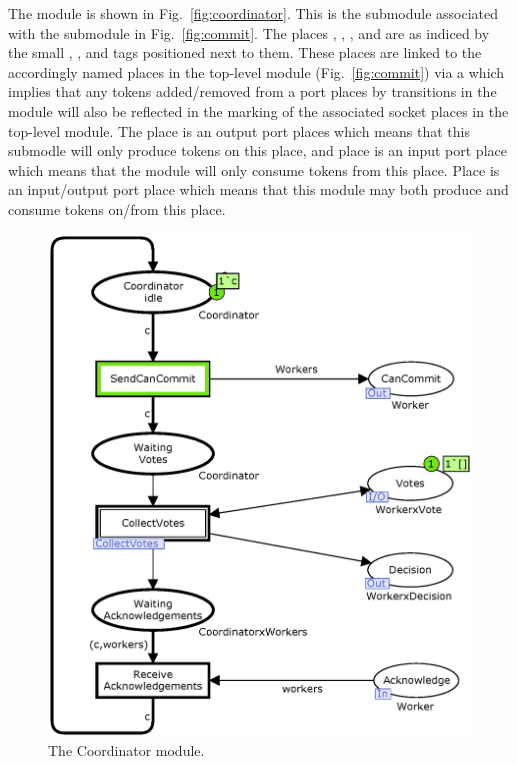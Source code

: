 
The  module is shown in
Fig.~\ref{fig:coordinator}. This is the submodule associated with the
 submodule in Fig.~\ref{fig:commit}. The places
, , , and
 are  as indiced by the
small , , and  tags positioned
next to them. These places are linked to the accordingly named places
in the top-level module (Fig.~\ref{fig:commit}) via a
 which implies that any tokens
added/removed from a port places by transitions in the
 module will also be reflected in the marking of
the associated socket places in the top-level module. The place
 is an output port places which means that this
submodle will only produce tokens on this place, and place
 is an input port place which means that the
module will only consume tokens from this place. Place 
is an input/output port place which means that this module may both
produce and consume tokens on/from this place. 

\begin{figure}[t]
\centering
\includegraphics[width=\columnwidth]{figures/Coordinator.eps}
\caption{The Coordinator module.}
\end{figure}

